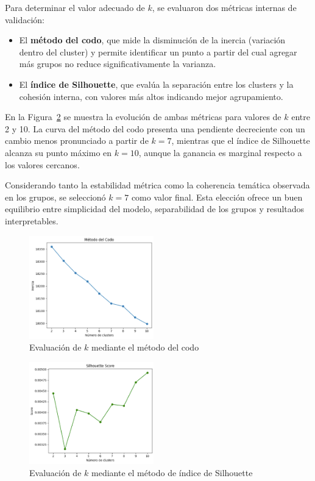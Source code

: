 \documentclass[journal]{IEEEtran}
\begin{document}
Para determinar el valor adecuado de $k$, se evaluaron dos métricas internas de validación:

\begin{itemize}
    \item El \textbf{método del codo}, que mide la disminución de la inercia (variación dentro del cluster) y permite identificar un punto a partir del cual agregar más grupos no reduce significativamente la varianza.
    \item El \textbf{índice de Silhouette}, que evalúa la separación entre los clusters y la cohesión interna, con valores más altos indicando mejor agrupamiento.
\end{itemize}

En la Figura~\ref{fig:elbow-silhouette} se muestra la evolución de ambas métricas para valores de $k$ entre 2 y 10. La curva del método del codo presenta una pendiente decreciente con un cambio menos pronunciado a partir de $k=7$, mientras que el índice de Silhouette alcanza su punto máximo en $k=10$, aunque la ganancia es marginal respecto a los valores cercanos.

\vspace{12pt}
Considerando tanto la estabilidad métrica como la coherencia temática observada en los grupos, se seleccionó $k=7$ como valor final. Esta elección ofrece un buen equilibrio entre simplicidad del modelo, separabilidad de los grupos y resultados interpretables.

\begin{figure}[H]
    \centering
    \includegraphics[width=0.48\textwidth]{fig3.png}
    \caption{Evaluación de $k$ mediante el método del codo}
    \label{fig:elbow-silhouette}
\end{figure}

\begin{figure}[H]
    \centering
    \includegraphics[width=0.48\textwidth]{fig2.png}
    \caption{Evaluación de $k$ mediante el método de índice de Silhouette}
    \label{fig:elbow-silhouette}
\end{figure}
\end{document}

